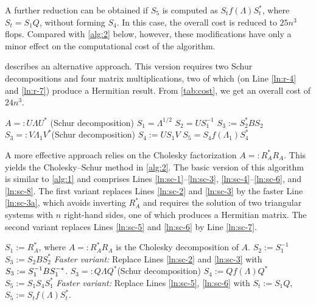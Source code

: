 \documentclass[DIV=14]{scrartcl}
\newcommand{\altline}[1]{\SetNlSty{}{\underline}{} \quad #1 \SetNlSty{}{}{}}
\theoremstyle{thmstyletwo}
\theoremstyle{definition}
\numberwithin{equation}{section}
\newcommand{\deq}{\ensuremath{:=}}
\newcommand{\deqr}{\ensuremath{=:}}
\renewcommand{\Lambda}{\varLambda}
\begin{document}
A further reduction can be obtained  if $S_5$ is computed as $S_tf(\Lambda) S_t^*$, where $S_t = S_1 Q$, without forming $S_4$. In this case, the overall cost is reduced to $25n^3$ flops.
Compared with \cref{alg:2} below, however, these modifications have only a minor effect on the computational cost of the algorithm.

 describes an alternative approach.
This version requires two Schur decompositions and four matrix multiplications, two of which (on Line \ref{ln:r-4} and
\ref{ln:r-7}) produce a Hermitian result. From \cref{tab:cost}, we get an overall cost of $24n^3$.

\begin{algorithm2e}[t]
\caption{Algorithm for computing $Af(A^{-1}B)$ using two Schur decompositions.}\label{alg:ref}

$A\deqr U\Lambda U^*$ \quad (Schur decomposition) \;\label{ln:r-1}
$S_1 = \Lambda^{1/2}$\;\label{ln:r-2}
$S_2=US_1^{-1}$\;\label{ln:r-3}
$S_3\deq S_2^*B S_2$\;\label{ln:r-4}
$S_3\deqr V\Lambda_1 V^*$\quad (Schur decomposition)\;\label{ln:r-5}
$S_4\deq U  S_1V$\;\label{ln:r-6}
$S_5=S_4 f(\Lambda_1)S_4^*$\;\label{ln:r-7}
\;
\end{algorithm2e}

A more effective approach relies on the Cholesky factorization $A \deqr{} R_A^*R_A$.
This yields the Cholesky--Schur method in \cref{alg:2}.
The basic version of this algorithm is similar to \cref{alg:1} and
comprises Lines \ref{ln:sc-1}--\ref{ln:sc-3}, \ref{ln:sc-4}--\ref{ln:sc-6}, and \ref{ln:sc-8}. The first variant replaces Lines \ref{ln:sc-2} and \ref{ln:sc-3} by the faster Line \ref{ln:sc-3a}, which avoids inverting $R_A^*$ and requires the solution of two triangular systems with $n$ right-hand sides, one of which produces a Hermitian matrix. The second variant replaces Lines \ref{ln:sc-5} and \ref{ln:sc-6} by Line \ref{ln:sc-7}.

\begin{algorithm2e}[t]
\caption{Cholesky--Schur algorithm for computing $Af(A^{-1}B).$}
\label{alg:2}
$S_1\deq R_A^*$, where $A=:R_A^*R_A$ is the Cholesky decomposition of $A$.\;\label{ln:sc-1}
$S_2\deq S_1^{-1}$\; \label{ln:sc-2}
$S_3\deq S_2 B S_2^{*}$\; \label{ln:sc-3}
\altline{\emph{Faster variant:} Replace Lines \ref{ln:sc-2} and \ref{ln:sc-3} with $S_3\deq \smash{S_1^{-1}BS_1^{-*}}$.\;} \label{ln:sc-3a}
$S_3\deqr Q\Lambda Q^*$\quad (Schur decomposition)\label{ln:sc-4}\;
$S_4\deq Qf(\Lambda )Q^*$\;\label{ln:sc-5}
$S_5\deq S_1S_4S_1^* $\;\label{ln:sc-6}
\altline{\emph{Faster variant:} Replace Lines \ref{ln:sc-5}, \ref{ln:sc-6} with $S_t\deq S_1Q$, $S_5\deq S_tf(\Lambda)S_t^*$.\;}\label{ln:sc-7}
\;\label{ln:sc-8}
\end{algorithm2e}
\end{document}
